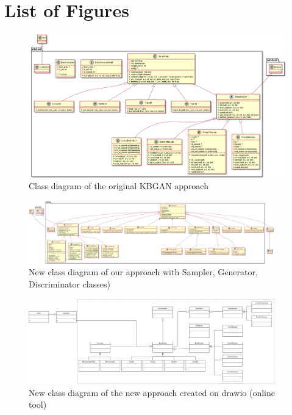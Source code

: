 
\chapter{List of Figures} \label{ch:appendix_diagrams}

\begin{figure}
  \centering
    \includegraphics[width=\textwidth]{appendices/kbgan_classdiagram.png}
  \caption{Class diagram of the original \ac{KBGAN} approach}
  \label{fig:overview}
\end{figure}

\begin{figure}
  \centering
    \includegraphics[width=0.95\textwidth]{appendices/NewClassDiagram.png}
  \caption{New class diagram of our approach with Sampler, Generator, Discriminator classes)}
  \label{fig:overview}
\end{figure}

\begin{figure}
  \centering
    \includegraphics[width=0.95\textwidth]{appendices/NewClassDiagram.drawio.png}
  \caption{New class diagram of the new approach created on drawio (online tool)}
  \label{fig:overview}
\end{figure}


